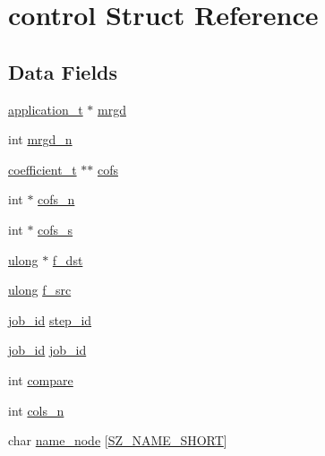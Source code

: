 \hypertarget{structcontrol}{}\section{control Struct Reference}
\label{structcontrol}
\subsection*{Data Fields}
\begin{DoxyCompactItemize}
\item 
\hyperlink{application_8h_af0a524c43fc5f548021099181df194bf}{application\+\_\+t} $\ast$ \hyperlink{structcontrol_a04135aa2d6b29eecc4170e2aaf6c3932}{mrgd}
\item 
int \hyperlink{structcontrol_a2832a41451be490d8662cc0a174f7a9d}{mrgd\+\_\+n}
\item 
\hyperlink{coefficient_8h_ae9e93dca86a1dd13e152e183589cdeda}{coefficient\+\_\+t} $\ast$$\ast$ \hyperlink{structcontrol_a1fb1319059177f24405d983bf9257d54}{cofs}
\item 
int $\ast$ \hyperlink{structcontrol_a16cff1fe6d8306a8e9feff2ec5cc61f7}{cofs\+\_\+n}
\item 
int $\ast$ \hyperlink{structcontrol_a1ebfe3ea1c817cf610430425debe0535}{cofs\+\_\+s}
\item 
\hyperlink{generic_8h_a718b4eb2652c286f4d42dc18a8e71a1a}{ulong} $\ast$ \hyperlink{structcontrol_a2ca4ca9e9600926841fec4705b3232a8}{f\+\_\+dst}
\item 
\hyperlink{generic_8h_a718b4eb2652c286f4d42dc18a8e71a1a}{ulong} \hyperlink{structcontrol_a71fd756129cdba3062b37dcf7f71059e}{f\+\_\+src}
\item 
\hyperlink{generic_8h_aa17a8e6cdc1860741119dc46c1777778}{job\+\_\+id} \hyperlink{structcontrol_a5c60a2ddd48af987e6e6f169f0bce418}{step\+\_\+id}
\item 
\hyperlink{generic_8h_aa17a8e6cdc1860741119dc46c1777778}{job\+\_\+id} \hyperlink{structcontrol_af1bc7a403a34f7e8250cf42a4bca8d34}{job\+\_\+id}
\item 
int \hyperlink{structcontrol_aa5390f4131964c9f5c3884e442cef205}{compare}
\item 
int \hyperlink{structcontrol_a65f0109f7133188cd43aeeaa3358b912}{cols\+\_\+n}
\item 
char \hyperlink{structcontrol_a468bfded513333b2191ea4dcecd52d7f}{name\+\_\+node} \mbox{[}\hyperlink{sizes_8h_aa1539eb7e3aa7e9eb929e62cfb80e621}{S\+Z\+\_\+\+N\+A\+M\+E\+\_\+\+S\+H\+O\+RT}\mbox{]}
\item 
$$
\end{DoxyCompactItemize}
